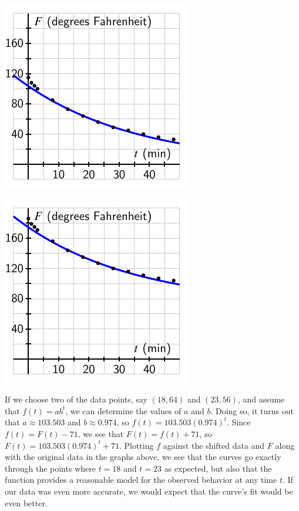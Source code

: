 \documentclass[nooutcomes]{ximera}
\begin{document}
\begin{image}
\includegraphics{modeling-coffee-shifted.pdf}
\end{image}

\begin{image}
\includegraphics{modeling-coffee-original.pdf}
\end{image}

If we choose two of the data points, say $(18,64)$ and $(23,56)$, and assume that $f(t) = ab^t$, we can determine the values of $a$ and $b$.  Doing so, it turns out that $a \approx 103.503$ and $b \approx 0.974$, so $f(t) = 103.503 ( 0.974)^t$.  Since $f(t) = F(t) - 71$, we see that $F(t) = f(t) + 71$, so $F(t) = 103.503 (0.974)^t + 71$.  Plotting $f$ against the shifted data and $F$ along with the original data in the graphs above, we see that the curves go exactly through the points where $t = 18$ and $t = 23$ as expected, but also that the function provides a reasonable model for the observed behavior at any time $t$.  If our data was even more accurate, we would expect that the curve's fit would be even better.
\end{document}

